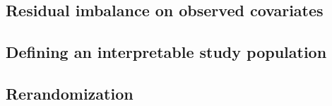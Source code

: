 \documentclass[12pt]{article}
\begin{document}
\begin{verse}  \end{verse}

\begin{verse}  \end{verse}

\begin{verse}  \end{verse}

\subsection{Residual imbalance on observed covariates}

\begin{verse}  \end{verse}

\begin{verse}  \end{verse}

\begin{verse}  \end{verse}

\begin{verse}  \end{verse}

\begin{verse}  \end{verse}

\subsection{Defining an interpretable study population}

\begin{verse}  \end{verse}

\begin{verse}  \end{verse}

\begin{verse}  \end{verse}

\begin{verse}  \end{verse}

\subsection{Rerandomization}
\end{document}
